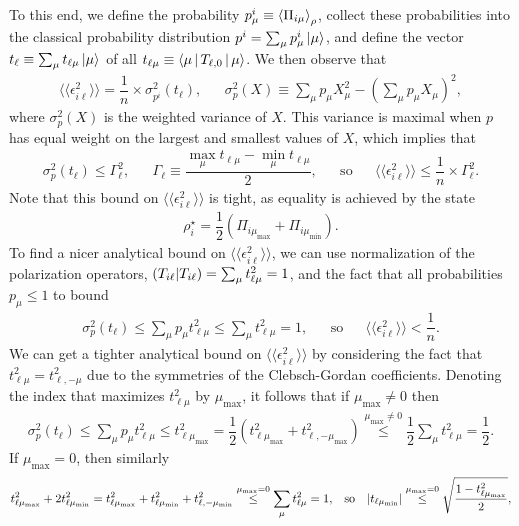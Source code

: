 \documentclass[notitlepage,twocolumn]{revtex4-2}
\renewcommand{\t}{\text} %
\newcommand{\f}[2]{\dfrac{#1}{#2}} %
\newcommand{\p}[1]{\left(#1\right)} %
\newcommand{\bk}{\Braket} %
\newcommand{\bbk}[1]{\langle\!\langle #1 \rangle\!\rangle}
\def\obk#1{\mathinner{({#1})}}
\begin{document}
To this end, we define the probability $p^i_\mu\equiv\bk{\Pi_{i\mu}}_\rho$, collect these probabilities into the classical probability distribution $p^i = \sum_\mu p^i_\mu \ket{\mu}$, and define the vector $t_\ell \equiv \sum_\mu t_{\ell\mu} \ket{\mu}$ of all $t_{\ell\mu}\equiv\bk{\mu|T_{\ell,0}|\mu}$.
We then observe that
\begin{align}
  \bbk{\epsilon_{i\ell}^2} = \f1n \times \sigma_{p^i}^2\p{t_\ell},
  &&
  \sigma_p^2\p{X}
  \equiv \sum_\mu p_\mu X_\mu^2 - \p{\sum_\mu p_\mu X_\mu}^2,
\end{align}
where $\sigma_p^2\p{X}$ is the weighted variance of $X$.
This variance is maximal when $p$ has equal weight on the largest and smallest values of $X$, which implies that
\begin{align}
  \sigma_p^2\p{t_\ell} \le \Gamma_\ell^2,
  &&
  \Gamma_\ell \equiv \f{\max_\mu t_{\ell\mu} - \min_\mu t_{\ell\mu}}{2},
  &&
  \t{so}
  &&
  \bbk{\epsilon_{i\ell}^2} \le \f1n \times \Gamma_\ell^2.
\end{align}
Note that this bound on $\bbk{\epsilon_{i\ell}^2}$ is tight, as equality is achieved by the state
\begin{align}
  \rho_i^\star = \f12\p{\Pi_{i\mu_{\t{max}}} + \Pi_{i\mu_{\t{min}}}}.
\end{align}
To find a nicer analytical bound on $\bbk{\epsilon_{i\ell}^2}$, we can use normalization of the polarization operators, $\obk{T_{i\ell}|T_{i\ell}}=\sum_\mu t_{\ell\mu}^2 = 1$, and the fact that all probabilities $p_\mu\le1$ to bound
\begin{align}
  \sigma_p^2\p{t_\ell} \le \sum_\mu p_\mu t_{\ell\mu}^2
  \le \sum_\mu t_{\ell\mu}^2 = 1,
  &&
  \t{so}
  &&
  \bbk{\epsilon_{i\ell}^2} < \f1n.
\end{align}
We can get a tighter analytical bound on $\bbk{\epsilon_{i\ell}^2}$ by considering the fact that $t_{\ell\mu}^2 = t_{\ell,-\mu}^2$ due to the symmetries of the Clebsch-Gordan coefficients.
Denoting the index that maximizes $t_{\ell\mu}^2$ by $\mu_{\t{max}}$, it follows that if $\mu_{\t{max}}\ne0$ then
\begin{align}
  \sigma_p^2\p{t_\ell} \le \sum_\mu p_\mu t_{\ell\mu}^2
  \le t_{\ell\mu_{\t{max}}}^2
  = \f12 \p{t_{\ell\mu_{\t{max}}}^2 + t_{\ell,-\mu_{\t{max}}}^2}
  \stackrel{\mu_{\t{max}}\ne0}{\le} \f12 \sum_\mu t_{\ell\mu}^2
  = \f12.
\end{align}
If $\mu_{\t{max}}=0$, then similarly
\begin{align}
  t_{\ell\mu_{\t{max}}}^2 + 2 t_{\ell\mu_{\t{min}}}^2
  = t_{\ell\mu_{\t{max}}}^2 + t_{\ell\mu_{\t{min}}}^2
  + t_{\ell,-\mu_{\t{min}}}^2
  \stackrel{\mu_{\t{max}}=0}{\le}
  \sum_\mu t_{\ell\mu}^2 = 1,
  &&
  \t{so}
  &&
  \abs{t_{\ell\mu_{\t{min}}}}
  \stackrel{\mu_{\t{max}}=0}{\le}
  \sqrt{\f{1 - t_{\ell\mu_{\t{max}}}^2}{2}},
\end{align}
\end{document}
